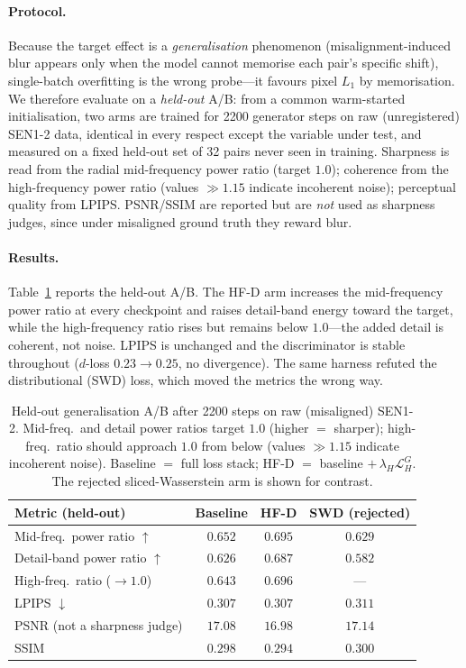 \paragraph{Protocol.} Because the target effect is a \emph{generalisation} phenomenon
(misalignment-induced blur appears only when the model cannot memorise each pair's specific
shift), single-batch overfitting is the wrong probe---it favours pixel $L_1$ by memorisation.
We therefore evaluate on a \emph{held-out} A/B: from a common warm-started initialisation, two
arms are trained for \num{2200} generator steps on raw (unregistered) SEN1-2 data, identical in
every respect except the variable under test, and measured on a fixed held-out set of
\num{32} pairs never seen in training. Sharpness is read from the radial mid-frequency power
ratio (target $1.0$); coherence from the high-frequency power ratio (values $\gg 1.15$ indicate
incoherent noise); perceptual quality from LPIPS. PSNR/SSIM are reported but are \emph{not}
used as sharpness judges, since under misaligned ground truth they reward blur.

\paragraph{Results.} Table~\ref{tab:hfd_ab} reports the held-out A/B. The HF-D arm increases the
mid-frequency power ratio at every checkpoint and raises detail-band energy toward the target,
while the high-frequency ratio rises but remains below $1.0$---the added detail is coherent, not
noise. LPIPS is unchanged and the discriminator is stable throughout ($d$-loss
$0.23\!\rightarrow\!0.25$, no divergence). The same harness refuted the distributional (SWD)
loss, which moved the metrics the wrong way.

\begin{table}[t]
\centering
\caption{Held-out generalisation A/B after \num{2200} steps on raw (misaligned) SEN1-2.
Mid-freq.\ and detail power ratios target $1.0$ (higher $=$ sharper); high-freq.\ ratio should
approach $1.0$ from below (values $\gg 1.15$ indicate incoherent noise). Baseline $=$ full loss
stack; HF-D $=$ baseline $+\,\lambda_H\mathcal{L}^G_H$. The rejected sliced-Wasserstein arm is
shown for contrast.}
\label{tab:hfd_ab}
\begin{tabular}{lccc}
\toprule
Metric (held-out) & Baseline & \textbf{HF-D} & SWD (rejected) \\
\midrule
Mid-freq.\ power ratio $\uparrow$   & $0.652$ & $\mathbf{0.695}$ & $0.629$ \\
Detail-band power ratio $\uparrow$  & $0.626$ & $\mathbf{0.687}$ & $0.582$ \\
High-freq.\ ratio ($\to 1.0$)       & $0.643$ & $0.696$          & --- \\
LPIPS $\downarrow$                  & $0.307$ & $0.307$          & $0.311$ \\
PSNR (not a sharpness judge)        & $17.08$ & $16.98$          & $17.14$ \\
SSIM                                & $0.298$ & $0.294$          & $0.300$ \\
\bottomrule
\end{tabular}
\end{table}

